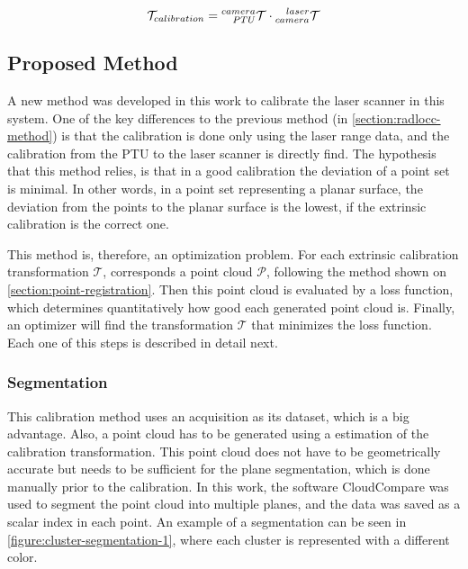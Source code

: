 \begin{equation}
    \label{eqn:radlocc-full-calibration}
    \mathcal{T}_{calibration} = \TF{PTU}{camera} \cdot \TF{camera}{laser}
\end{equation}

\subsection{Proposed Method}
\label{section:proposed-method}

A new method was developed in this work to calibrate the laser scanner in this system. One of the key differences to the previous method (in \cref{section:radlocc-method}) is that the calibration is done only using the laser range data, and the calibration from the PTU to the laser scanner is directly find. The hypothesis that this method relies, is that in a good calibration the deviation of a point set is minimal. In other words, in a point set representing a planar surface, the deviation from the points to the planar surface is the lowest, if the extrinsic calibration is the correct one.

This method is, therefore, an optimization problem. For each extrinsic calibration transformation $\mathcal{T}$, corresponds a point cloud $\mathcal{P}$, following the method shown on \cref{section:point-registration}. Then this point cloud is evaluated by a loss function, which determines quantitatively how good each generated point cloud is. Finally, an optimizer will find the transformation $\mathcal{T}$ that minimizes the loss function. Each one of this steps is described in detail next.

\subsubsection{Segmentation}

This calibration method uses an acquisition as its dataset, which is a big advantage. Also, a point cloud has to be generated using a estimation of the calibration transformation. This point cloud does not have to be geometrically accurate but needs to be sufficient for the plane segmentation, which is done manually prior to the calibration. In this work, the software CloudCompare was used to segment the point cloud into multiple planes, and the data was saved as a scalar index in each point. An example of a segmentation can be seen in \cref{figure:cluster-segmentation-1}, where each cluster is represented with a different color.

